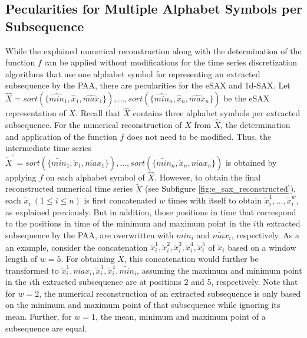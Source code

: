 \subsection*{Pecularities for Multiple Alphabet Symbols per Subsequence}
While the explained numerical reconstruction along with the determination of the function $f$ can be applied without modifications for the time series discretization algorithms that use one alphabet symbol for representing an extracted subsequence by the \ac{PAA}, there are pecularities for the \ac{eSAX} and \ac{1d-SAX}. \newline
Let $\hat{X} = sort(\{\hat{min}_1, \hat{x}_1, \hat{max}_1\}), ..., sort(\{\hat{min}_n, \hat{x}_n, \hat{max}_n\})$ be the \ac{eSAX} representation of $X$. Recall that $\hat{X}$ contains three alphabet symbols per extracted subsequence. For the numerical reconstruction of $X$ from $\hat{X}$, the determination and application of the function $f$ does not need to be modified. Thus, the intermediate time series $\tilde{X}^{'} = sort(\{\tilde{min}_1, \tilde{x}_1, \tilde{max}_1\}), ..., sort(\{\tilde{min}_n, \tilde{x}_n, \tilde{max}_n\})$ is obtained by applying $f$ on each alphabet symbol of $\hat{X}$. However, to obtain the final reconstructed numerical time series $\tilde{X}$ (see Subfigure \ref{fig:e_sax_reconstructed}), each $\tilde{x}_i \ (1 \leq i \leq n)$ is first concatenated $w$ times with itself to obtain $\tilde{x}_{i}^{1}, ..., \tilde{x}_{i}^{w}$, as explained previously. But in addition, those positions in time that correspond to the positions in time of the minimum and maximum point in the $i$th extracted subsequence by the \ac{PAA}, are overwritten with $\tilde{min}_i$ and $\tilde{max}_i$, respectively. As a an example, consider the concatenation $\tilde{x}_{i}^1, \tilde{x}_{i}^2, \tilde{x}_{i}^3, \tilde{x}_{i}^4, \tilde{x}_{i}^5$ of $\tilde{x}_i$ based on a window length of $w = 5$. For obtaining $\tilde{X}$, this concatenation would further be transformed to $\tilde{x}_{i}^1, \tilde{max}_{i}, \tilde{x}_{i}^3, \tilde{x}_{i}^4, \tilde{min}_{i}$, assuming the maximum and minimum point in the $i$th extracted subsequence are at positions 2 and 5, respectively. Note that for $w = 2$, the numerical reconstruction of an extracted subsequence is only based on the minimum and maximum point of that subsequence while ignoring its mean. Further, for $w = 1$, the mean, minimum and maximum point of a subsequence are equal. \newline
